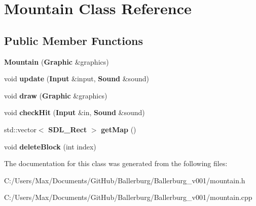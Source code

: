 \section{Mountain Class Reference}
\label{class_mountain}
\subsection*{Public Member Functions}
\begin{DoxyCompactItemize}
\item 
{\bfseries Mountain} ({\bf Graphic} \&graphics)\label{class_mountain_ae5e5250815fe5cf2f8448a331c8c7604}

\item 
void {\bfseries update} ({\bf Input} \&input, {\bf Sound} \&sound)\label{class_mountain_ab0ebe70029e2bf21d50d7f0517217e12}

\item 
void {\bfseries draw} ({\bf Graphic} \&graphics)\label{class_mountain_acc7a7808b86e6e6ccd50684fb10a884c}

\item 
void {\bfseries check\+Hit} ({\bf Input} \&in, {\bf Sound} \&sound)\label{class_mountain_a5cf0e34242918fdf2f197c8a08bc6721}

\item 
std\+::vector$<$ {\bf S\+D\+L\+\_\+\+Rect} $>$ {\bfseries get\+Map} ()\label{class_mountain_a052e5b287efe7e11c90ce0af651b349f}

\item 
void {\bfseries delete\+Block} (int index)\label{class_mountain_ab15bc8f4bb480c9553e05d2755eb2e90}

\end{DoxyCompactItemize}


The documentation for this class was generated from the following files\+:\begin{DoxyCompactItemize}
\item 
C\+:/\+Users/\+Max/\+Documents/\+Git\+Hub/\+Ballerburg/\+Ballerburg\+\_\+v001/mountain.\+h\item 
C\+:/\+Users/\+Max/\+Documents/\+Git\+Hub/\+Ballerburg/\+Ballerburg\+\_\+v001/mountain.\+cpp\end{DoxyCompactItemize}
